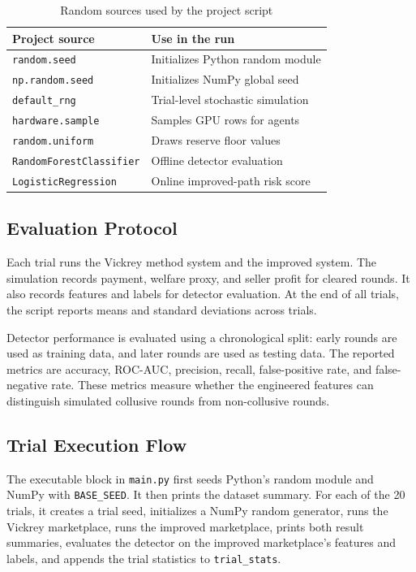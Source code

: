 \documentclass[conference]{IEEEtran}
\begin{document}
\begin{table}[htbp]
\caption{Random sources used by the project script}
\label{tab:randomsources}
\centering
\begin{tabular}{ll}
\toprule
\textbf{Project source} & \textbf{Use in the run} \\
\midrule
\texttt{random.seed} & Initializes Python random module \\
\texttt{np.random.seed} & Initializes NumPy global seed \\
\texttt{default\_rng} & Trial-level stochastic simulation \\
\texttt{hardware.sample} & Samples GPU rows for agents \\
\texttt{random.uniform} & Draws reserve floor values \\
\texttt{RandomForestClassifier} & Offline detector evaluation \\
\texttt{LogisticRegression} & Online improved-path risk score \\
\bottomrule
\end{tabular}
\end{table}

\subsection{Evaluation Protocol}
Each trial runs the Vickrey method system and the improved system. The simulation records payment, welfare proxy, and seller profit for cleared rounds. It also records features and labels for detector evaluation. At the end of all trials, the script reports means and standard deviations across trials.

Detector performance is evaluated using a chronological split: early rounds are used as training data, and later rounds are used as testing data. The reported metrics are accuracy, ROC-AUC, precision, recall, false-positive rate, and false-negative rate. These metrics measure whether the engineered features can distinguish simulated collusive rounds from non-collusive rounds.

\subsection{Trial Execution Flow}
The executable block in \texttt{main.py} first seeds Python's random module and NumPy with \texttt{BASE\_SEED}. It then prints the dataset summary. For each of the 20 trials, it creates a trial seed, initializes a NumPy random generator, runs the Vickrey marketplace, runs the improved marketplace, prints both result summaries, evaluates the detector on the improved marketplace's features and labels, and appends the trial statistics to \texttt{trial\_stats}.
\end{document}
